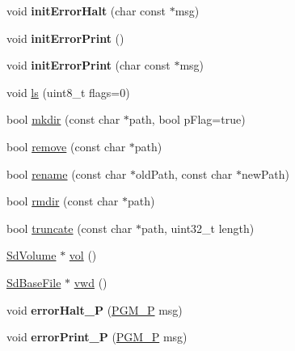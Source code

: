 \begin{DoxyCompactItemize}
\item 
void {\bfseries init\+Error\+Halt} (char const $\ast$msg)\hypertarget{class_sd_fat_a28e8e4d72848a1024056c4b59a18fb78}{}\label{class_sd_fat_a28e8e4d72848a1024056c4b59a18fb78}

\item 
void {\bfseries init\+Error\+Print} ()\hypertarget{class_sd_fat_ae2210d3d663bd54740eddfb83bcf4473}{}\label{class_sd_fat_ae2210d3d663bd54740eddfb83bcf4473}

\item 
void {\bfseries init\+Error\+Print} (char const $\ast$msg)\hypertarget{class_sd_fat_a6ea82316a10297b53393c39034d560fb}{}\label{class_sd_fat_a6ea82316a10297b53393c39034d560fb}

\item 
void \hyperlink{class_sd_fat_a74846855ee6cd53b1716adeaf630b12c}{ls} (uint8\+\_\+t flags=0)
\item 
bool \hyperlink{class_sd_fat_a1fe08676296e10b4c1e30311ce35b4de}{mkdir} (const char $\ast$path, bool p\+Flag=true)
\item 
bool \hyperlink{class_sd_fat_affdaad4aeac6fc6d678b21c2a271d09d}{remove} (const char $\ast$path)
\item 
bool \hyperlink{class_sd_fat_a39afa05b07c30872b27c3d2b53b56911}{rename} (const char $\ast$old\+Path, const char $\ast$new\+Path)
\item 
bool \hyperlink{class_sd_fat_a9ece030794f3fb78018cfc9803a62c69}{rmdir} (const char $\ast$path)
\item 
bool \hyperlink{class_sd_fat_ac0c2ed27d37bdb1b50f4543253871c1e}{truncate} (const char $\ast$path, uint32\+\_\+t length)
\item 
\hyperlink{class_sd_volume}{Sd\+Volume} $\ast$ \hyperlink{class_sd_fat_a9fca7480532e54b828a3a31015f7c905}{vol} ()
\item 
\hyperlink{class_sd_base_file}{Sd\+Base\+File} $\ast$ \hyperlink{class_sd_fat_a7027f78e1febb655009b62d7f6c10bbb}{vwd} ()
\item 
void {\bfseries error\+Halt\+\_\+P} (\hyperlink{_sd_base_file_8h_a963f816fc88a5d8479c285ed4c630229}{P\+G\+M\+\_\+P} msg)\hypertarget{class_sd_fat_a1ddef63d71c00f49a521e8a81472fd60}{}\label{class_sd_fat_a1ddef63d71c00f49a521e8a81472fd60}

\item 
void {\bfseries error\+Print\+\_\+P} (\hyperlink{_sd_base_file_8h_a963f816fc88a5d8479c285ed4c630229}{P\+G\+M\+\_\+P} msg)\hypertarget{class_sd_fat_ab432c14265f396c3559e575fe3cd512b}{}\label{class_sd_fat_ab432c14265f396c3559e575fe3cd512b}


\end{DoxyCompactItemize}
